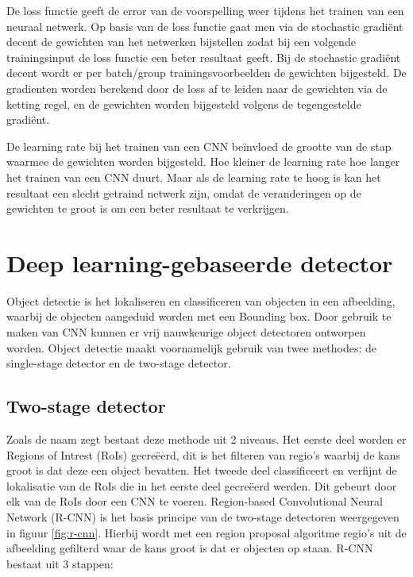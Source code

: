 De loss functie geeft de error van de voorspelling weer tijdens het trainen van een neuraal netwerk. 
Op basis van de loss functie gaat men via de stochastic gradi\"ent decent de gewichten van het netwerken bijstellen zodat bij een volgende trainingsinput de loss functie een beter resultaat geeft. 
Bij de stochastic gradi\"ent decent wordt er per batch/group trainingsvoorbeelden de gewichten bijgesteld. 
De gradienten worden berekend door de loss af te leiden naar de gewichten via de ketting regel, en de gewichten worden bijgesteld volgens de tegengestelde gradi\"ent. 

De learning rate bij het trainen van een CNN be\"invloed de grootte van de stap waarmee de gewichten worden bijgesteld.
Hoe kleiner de learning rate hoe langer het trainen van een CNN duurt.
Maar als de learning rate te hoog is kan het resultaat een slecht getraind netwerk zijn, omdat de veranderingen op de gewichten te groot is om een beter resultaat te verkrijgen.


\section{Deep learning-gebaseerde detector}
Object detectie is het lokaliseren en classificeren van objecten in een afbeelding, waarbij de objecten aangeduid worden met een Bounding box. 
Door gebruik te maken van CNN kunnen er vrij nauwkeurige object detectoren ontworpen worden. 
Object detectie maakt voornamelijk gebruik van twee methodes: de single-stage detector en de two-stage detector.

\subsection{Two-stage detector}
Zoals de naam zegt bestaat deze methode uit 2 niveaus. 
Het eerste deel worden er Regions of Intrest (RoIs) gecre\"eerd, dit is het filteren van regio's waarbij de kans groot is dat deze een object bevatten. 
Het tweede deel classificeert en verfijnt de lokalisatie van de RoIs die in het eerste deel gecre\"eerd werden. 
Dit gebeurt door elk van de RoIs door een CNN te voeren. 
Region-based Convolutional Neural Network (R-CNN) \cite{girshick_fast_2015} is het basis principe van de two-stage detectoren weergegeven in figuur \ref{fig:r-cnn}. 
Hierbij wordt met een region proposal algoritme regio's uit de afbeelding gefilterd waar de kans groot is dat er objecten op staan.
R-CNN bestaat uit 3 stappen:
 
